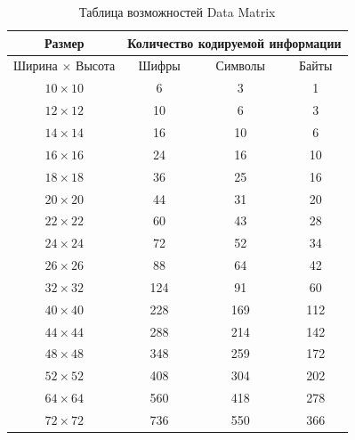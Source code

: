 \begin{table}[htb]
\centering
\caption{Таблица возможностей Data Matrix}
\begin{tabular}{|c|c|c|c|}
    \hline 
    Размер & \multicolumn{3}{c|}{Количество кодируемой информации} \\ 
    
    \hline 
    Ширина $\times$ Высота & Шифры & Символы & Байты \\
    
    \hline 
    $10 \times 10$ & 6 & 3 & 1 \\
    
    \hline 
    $12 \times 12$ & 10 & 6 & 3 \\
    
    \hline 
    $14 \times 14$ & 16 & 10 & 6 \\
    
    \hline 
    $16 \times 16$ & 24 & 16 & 10 \\
    
    \hline 
    $18 \times 18$ & 36 & 25 & 16 \\
    
    \hline 
    $20 \times 20$ & 44 & 31 & 20 \\
    
    \hline 
    $22 \times 22$ & 60 & 43 & 28 \\
    
    \hline 
    $24 \times 24$ & 72 & 52 & 34 \\
    
    \hline 
    $26 \times 26$ & 88 & 64 & 42 \\
    
    \hline 
    $32 \times 32$ & 124 & 91 & 60 \\
    
    \hline 
    $40 \times 40$ & 228 & 169 & 112 \\
    
    \hline 
    $44 \times 44$ & 288 & 214 & 142 \\
    
    \hline 
    $48 \times 48$ & 348 & 259 & 172 \\
    
    \hline 
    $52 \times 52$ & 408 & 304 & 202 \\
    
    \hline 
    $64 \times 64$ & 560 & 418 & 278 \\
    
    \hline 
    $72 \times 72$ & 736 & 550 & 366 \\
    

\end{tabular}
\end{table}
